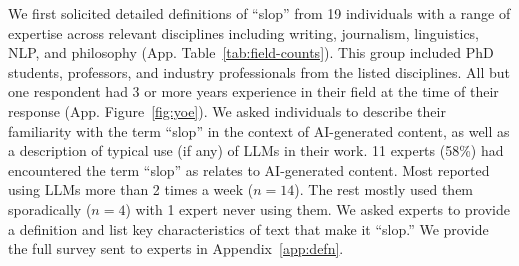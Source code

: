 \documentclass{article} %
\begin{document}
\begin{table}
\centering
{}
\caption{Themes and codes for slop, count of expert responses containing each.}
\label{tab:taxonomy}
\end{table}

We first solicited detailed definitions of ``slop'' from 19 individuals with a range of expertise across relevant disciplines including writing, journalism, linguistics, NLP, and philosophy (App. Table~\ref{tab:field-counts}). 
This group included PhD students, professors, and industry professionals from the listed disciplines. 
All but one respondent had 3 or more years experience in their field at the time of their response (App. Figure~\ref{fig:yoe}). 
We asked individuals to describe their familiarity with the term ``slop'' in the context of AI-generated content, as well as a description of typical use (if any) of LLMs in their work.
11 experts (58\%) had encountered the term ``slop'' as relates to AI-generated content. 
Most reported using LLMs more than 2 times a week ($n=14$).  The rest mostly used them sporadically ($n=4$) with 1 expert never using them. 
We asked experts to provide a definition and list key characteristics of text that make it ``slop.''
We provide the full survey sent to experts in Appendix~\ref{app:defn}.
\end{document}
